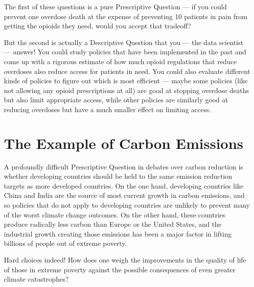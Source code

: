 \documentclass[letterpaper,10pt,english]{jupyterBook}
\begin{document}
\sphinxAtStartPar
The first of these questions is a pure Prescriptive Question — if you could prevent one overdose death at the expense of preventing 10 patients in pain from getting the opioids they need, would you accept that trade\sphinxhyphen{}off?

\sphinxAtStartPar
But the second is actually a Descriptive Question that you — the data scientist —  answer! You could study policies that have been implemented in the past and come up with a rigorous estimate of how much opioid regulations that reduce overdoses also reduce access for patients in need. You could also evaluate different kinds of policies to figure out which is most efficient — maybe some policies (like not allowing any opioid prescriptions at all) are good at stopping overdose deaths but also  limit appropriate access, while other policies are similarly good at reducing overdoses but have a much smaller effect on limiting access.


\section{The Example of Carbon Emissions}
\label{\detokenize{30_questions/05_descriptive_v_prescriptive:the-example-of-carbon-emissions}}
\sphinxAtStartPar
A profoundly difficult Prescriptive Question in debates over carbon reduction is whether developing countries should be held to the same emission reduction targets as more developed countries. On the one hand, developing countries like China and India are the source of most current growth in carbon emissions, and so policies that do not apply to developing countries are unlikely to prevent many of the worst climate change outcomes. On the other hand, these countries produce radically less carbon  than Europe or the United States, and the industrial growth creating those emissions has been a major factor in lifting billions of people out of extreme poverty.

\sphinxAtStartPar
Hard choices indeed! How does one weigh the improvements in the quality of life of those in extreme poverty against the possible consequences of even greater climate catastrophes?
\end{document}
